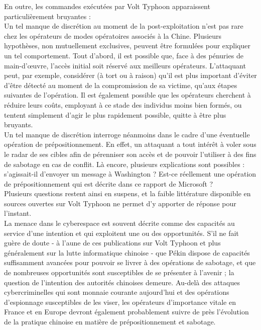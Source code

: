 \documentclass[a4paper]{article}
\begin{document}
En outre, les commandes exécutées par Volt Typhoon apparaissent particulièrement bruyantes :
\\

Un tel manque de discrétion au moment de la post-exploitation n’est pas rare chez les opérateurs de modes opératoires associés à la Chine. Plusieurs hypothèses, non mutuellement exclusives, peuvent être formulées pour expliquer un tel comportement. Tout d’abord, il est possible que, face à des pénuries de main-d’œuvre, l’accès initial soit réservé aux meilleurs opérateurs. L’attaquant peut, par exemple, considérer (à tort ou à raison) qu’il est plus important d’éviter d’être détecté au moment de la compromission de sa victime, qu’aux étapes suivantes de l’opération. Il est également possible que les opérateurs cherchent à réduire leurs coûts, employant à ce stade des individus moins bien formés, ou tentent simplement d’agir le plus rapidement possible, quitte à être plus bruyants.
\\

Un tel manque de discrétion interroge néanmoins dans le cadre d’une éventuelle opération de prépositionnement. En effet, un attaquant a tout intérêt à voler sous le radar de ses cibles afin de pérenniser son accès et de pouvoir l’utiliser à des fins de sabotage en cas de conflit. Là encore, plusieurs explications sont possibles : s’agissait-il d’envoyer un message à Washington ? Est-ce réellement une opération de prépositionnement qui est décrite dans ce rapport de Microsoft ? 
\\

Plusieurs questions restent ainsi en suspens, et la faible littérature disponible en sources ouvertes sur Volt Typhoon ne permet d’y apporter de réponse pour l’instant.
\\

La menace dans le cyberespace est souvent décrite comme des capacités au service d’une intention et qui exploitent une ou des opportunités. S’il ne fait guère de doute - à l’aune de ces publications sur Volt Typhoon et plus généralement sur la lutte informatique chinoise - que Pékin dispose de capacités suffisamment avancées pour pouvoir se livrer à des opérations de sabotage, et que de nombreuses opportunités sont susceptibles de se présenter à l’avenir ; la question de l’intention des autorités chinoises demeure. Au-delà des attaques cybercriminelles qui sont monnaie courante aujourd’hui et des opérations d’espionnage susceptibles de les viser, les opérateurs d’importance vitale en France et en Europe devront également probablement suivre de près l’évolution de la pratique chinoise en matière de prépositionnement et sabotage.
\end{document}
